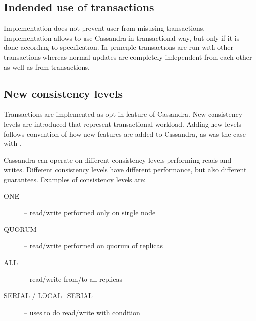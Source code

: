 \subsection{Indended use of transactions}
Implementation does not prevent user from misusing transactions. Implementation allows to use Cassandra in transactional way, but only if it is done according to specification. In principle transactions are run with other transactions whereas normal updates are completely independent from each other as well as from transactions. 






\subsection{New consistency levels}
Transactions are implemented as opt-in feature of Cassandra. New consistency levels  are introduced that represent transactional workload. Adding new levels follows convention of how new features are added to Cassandra, as was the case with \lwt. 
 
Cassandra can operate on different consistency levels performing reads and writes. Different consistency levels have different performance, but also different guarantees. Examples of consistency levels are:
\begin{description}
\item[ONE] -- read/write performed only on single node
\item[QUORUM] -- read/write performed on quorum of replicas
\item[ALL] -- read/write from/to all replicas
\item[SERIAL / LOCAL_SERIAL] -- uses \lwt to do read/write with condition
\end{description}

